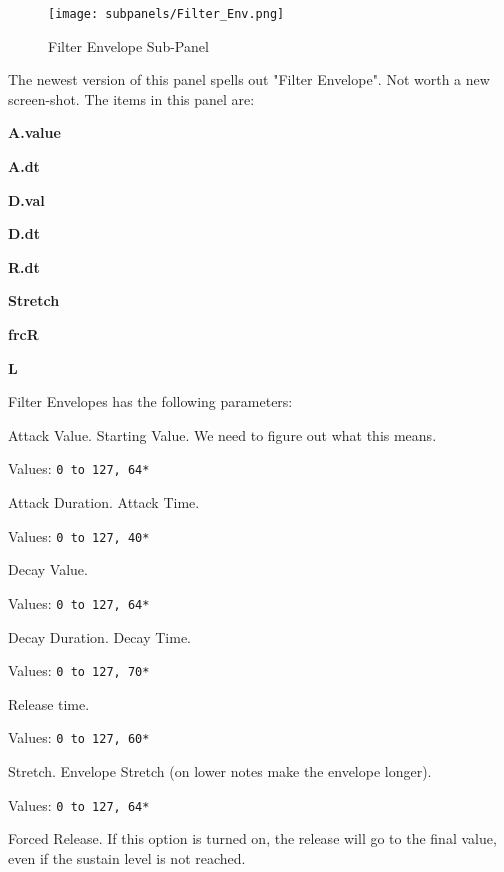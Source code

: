 \begin{figure}[H]
   \centering 
   \texttt{[image: subpanels/Filter\_Env.png]}
   \caption[Filter Envelope Sub-Panel]{Filter Envelope Sub-Panel}
   \label{fig:filter_env}
\end{figure}

   The newest version of this panel spells out "Filter Envelope".
   Not worth a new screen-shot.
   The items in this panel are:

   \begin{enumber}
      \item \textbf{A.value}
      \item \textbf{A.dt}
      \item \textbf{D.val}
      \item \textbf{D.dt}
      \item \textbf{R.dt}
      \item \textbf{Stretch}
      \item \textbf{frcR}
      \item \textbf{L}
   \end{enumber}

   Filter Envelopes has the following parameters:

   \setcounter{ItemCounter}{0}      %

   Attack Value.  Starting Value.
   We need to figure out what this means.

   Values: \texttt{0 to 127, 64*}

   Attack Duration.  Attack Time.

   Values: \texttt{0 to 127, 40*}

   Decay Value.

   Values: \texttt{0 to 127, 64*}

   Decay Duration.  Decay Time.

   Values: \texttt{0 to 127, 70*}

   Release time.

   Values: \texttt{0 to 127, 60*}

   Stretch.
   Envelope Stretch (on lower notes make the envelope longer).

   Values: \texttt{0 to 127, 64*}

   Forced Release.
   If this option is turned on, the release will go to the
   final value, even if the sustain level is not reached.

